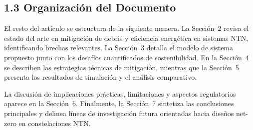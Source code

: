 \subsection{1.3 Organización del Documento}

El resto del artículo se estructura de la siguiente manera. La Sección~2 revisa el estado del arte en mitigación de debris y eficiencia energética en sistemas NTN, identificando brechas relevantes. La Sección~3 detalla el modelo de sistema propuesto junto con los desafíos cuantificados de sostenibilidad. En la Sección~4 se describen las estrategias técnicas de mitigación, mientras que la Sección~5 presenta los resultados de simulación y el análisis comparativo.

La discusión de implicaciones prácticas, limitaciones y aspectos regulatorios aparece en la Sección~6. Finalmente, la Sección~7 sintetiza las conclusiones principales y delinea líneas de investigación futura orientadas hacia diseños net-zero en constelaciones NTN.